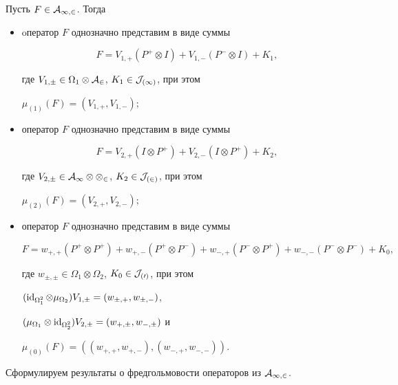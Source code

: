 \begin{thm} 


Пусть $F\in\cal A_{1,2}$. Тогда 


\begin{itemize} 


\item[1)] oператор $F$ однозначно представим в виде суммы 


$$ 


F=V_{1,+}(P^+\otimes I)+V_{1,-}(P^-\otimes I)+K_1, 


$$ 


где $V_{1,\pm}\in\Omega_1\otimes\cal A_2$, $K_1\in\cal J_{(1)}$, при этом 


$\mu_{(1)}(F)=(V_{1,+},V_{1,-});$ 


\item[2)] оператор $F$ однозначно представим в виде суммы 


$$ 


F=V_{2,+}(I\otimes P^+)+V_{2,-}(I\otimes P^+)+K_2, 


$$ 


где $V_{2,\pm}\in\cal A_1\otimes\Omega_2$, $K_2\in\cal J_{(2)}$, при этом 


$\mu_{(2)}(F)=(V_{2,+},V_{2,-});$ 


\item[3)] оператор $F$ однозначно представим в виде суммы 


$$ 


F=w_{+,+}(P^+\otimes P^+)+w_{+,-}(P^+\otimes P^-)+w_{-,+} 


(P^-\otimes P^+)+w_{-,-}(P^-\otimes P^-)+K_0, 


$$ 


где $w_{\pm,\pm}\in\Omega_1\otimes\Omega_2$, $K_0\in\cal J_{(0)}$, при этом 


$(\operatorname{id}_{\Omega^2_1}\otimes\mu_{\Omega_2})V_{1,\pm}=(w_{\pm,+},w_{\pm,-})$, 


$(\mu_{\Omega_1}\otimes\operatorname{id}_{\Omega^2_2})V_{2,\pm}= (w_{+,\pm},w_{-,\pm})$ и 


$\mu_{(0)}(F)=((w_{+,+},w_{+,-}), (w_{-,+},w_{-,-}))$. 


\end{itemize} 


\end{thm} 


 


Сформулируем результаты о фредгольмовости операторов из $\cal A_{1,2}$. 


